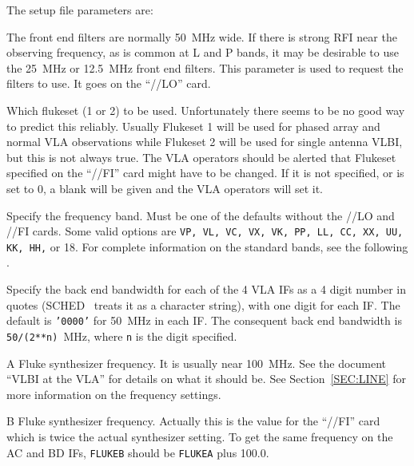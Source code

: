 \documentclass{report}
\newcommand{\schedb}{{\sc SCHED~}}
\begin{document}
The setup file parameters are:

\begin{list}{}{\parsep 0em  \itemsep 0em }

\item {} The front end filters are
normally 50~MHz wide. If there is strong RFI near the observing
frequency, as is common at L and P bands, it may be desirable to use
the 25~MHz or 12.5~MHz front end filters. This parameter is used to
request the filters to use. It goes on the ``//LO'' card.

\item {} Which flukeset (1 or 2)
to be used. Unfortunately there seems to be no good way to predict
this reliably. Usually Flukeset 1 will be used for phased array and
normal VLA observations while Flukeset 2 will be used for single
antenna VLBI, but this is not always true. The VLA operators should be
alerted that Flukeset specified on the ``//FI'' card might have to be
changed. If it is not specified, or is set to 0, a blank will be given
and the VLA operators will set it.

\item {} Specify the frequency band.
Must be one of the defaults without the //LO and //FI cards.  Some
valid options are {\tt VP, VL, VC, VX, VK, PP, LL, CC, XX, UU, KK,
HH,} or 18.  For complete information on the standard bands, see
the following .

\item {} Specify the back end bandwidth
for each of the 4 VLA IFs as a 4 digit number in quotes (\schedb
treats it as a character string), with one digit for each IF. The
default is {\tt '0000'} for 50~MHz in each IF. The consequent back end
bandwidth is {\tt 50/(2**n)}~MHz, where {\tt n} is the digit
specified.

\item {} A Fluke synthesizer frequency.
It is usually near 100~MHz. See the document ``VLBI at the VLA'' for
details on what it should be. See Section~\ref{SEC:LINE} for more
information on the frequency settings.

\item {} B Fluke synthesizer frequency.
Actually this is the value for the ``//FI'' card which is twice the
actual synthesizer setting.  To get the same frequency on the AC and
BD IFs, {\tt FLUKEB} should be {\tt FLUKEA} plus 100.0.


\end{list}
\end{document}
